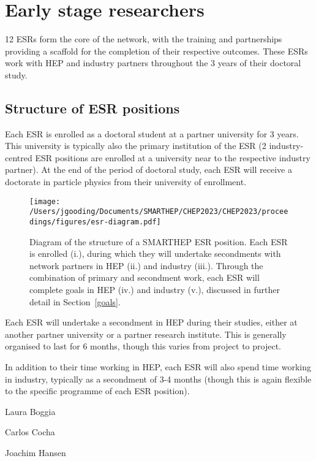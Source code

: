 \section{Early stage researchers}
\label{esrs}
12 ESRs form the core of the network, with the training and partnerships providing a scaffold for the completion of their respective outcomes. These ESRs work with HEP and industry partners throughout the 3 years of their doctoral study.%

\subsection{Structure of ESR positions}
\label{esr-structure}
Each ESR is enrolled as a doctoral student at a partner university for 3 years. This university is typically also the primary institution of the ESR (2 industry-centred ESR positions are enrolled at a university near to the respective industry partner). At the end of the period of doctoral study, each ESR will receive a doctorate in particle physics from their university of enrollment.\par
\begin{figure*}[h!]
    \centering
    \texttt{[image: /Users/jgooding/Documents/SMARTHEP/CHEP2023/CHEP2023/proceedings/figures/esr-diagram.pdf]}
    \caption{Diagram of the structure of a SMARTHEP ESR position. Each ESR is enrolled (i.), during which they will undertake secondments with network partners in HEP (ii.) and industry (iii.). Through the combination of primary and secondment work, each ESR will complete goals in HEP (iv.) and industry (v.), discussed in further detail in Section~\ref{goals}.}
    \label{esr-diagram}       %
\end{figure*}

Each ESR will undertake a secondment in HEP during their studies, either at another partner university or a partner research institute. This is generally organised to last for 6 months, though this varies from project to project.\par

In addition to their time working in HEP, each ESR will also spend time working in industry, typically as a secondment of 3-4 months (though this is again flexible to the specific programme of each ESR position).\par

Laura Boggia  \par

Carlos Cocha \par

Joachim Hansen 